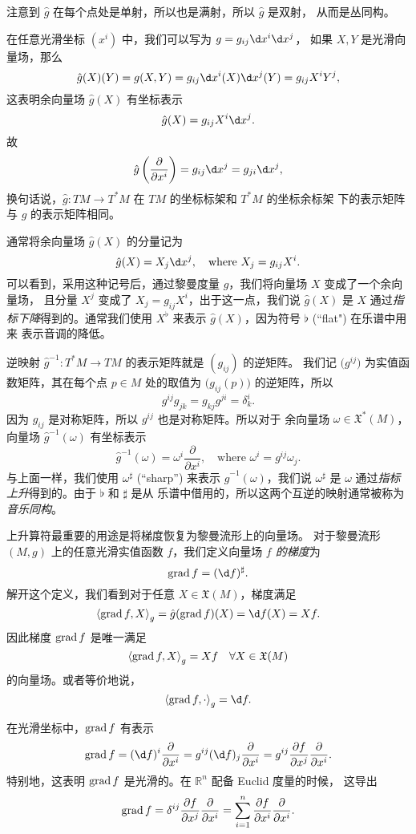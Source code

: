 注意到 $\hat g$ 在每个点处是单射，所以也是满射，所以 $\hat g$ 是双射，
从而是丛同构。

在任意光滑坐标 $(x^i)$ 中，我们可以写为 $g=g_{ij}\d x^i\d x^j$，
如果 $X,Y$ 是光滑向量场，那么
\[
  \hat g(X)(Y)=g(X,Y)=g_{ij}\d x^i(X)\d x^j(Y)=
  g_{ij}X^iY^j,  
\]
这表明余向量场 $\hat g(X)$ 有坐标表示
\[
  \hat g(X)=g_{ij}X^i\d x^j.  
\]
故
\[
  \hat g\left(\frac{\partial}{\partial x^i}\right)=
  g_{ij} \d x^j=g_{ji}\d x^j,  
\]
换句话说，$\hat g:TM\to T^*M$ 在 $TM$ 的坐标标架和 $T^*M$ 的坐标余标架
下的表示矩阵与 $g$ 的表示矩阵相同。

通常将余向量场 $\hat g(X)$ 的分量记为
\[
  \hat g(X)=X_j\d x^j,\quad \text{where $X_j=g_{ij}X^i$}.  
\]
可以看到，采用这种记号后，通过黎曼度量 $g$，我们将向量场 $X$ 变成了一个余向量场，
且分量 $X^j$ 变成了 $X_j=g_{ij}X^i$，出于这一点，我们说
$\hat g(X)$ 是 $X$ 通过\emph{指标下降}得到的。通常我们使用 
$X^\flat$ 来表示 $\hat g(X)$，因为符号 $\flat$ (``flat") 在乐谱中用来
表示音调的降低。

逆映射 $\hat g^{-1}:T^*M\to TM$ 的表示矩阵就是 $(g_{ij})$ 的逆矩阵。
我们记 $\bigl(g^{ij}\bigr)$ 为实值函数矩阵，其在每个点 $p\in M$
处的取值为 $\bigl(g_{ij}(p)\bigr)$ 的逆矩阵，所以
\[
  g^{ij}g_{jk}=g_{kj}g^{ji}=\delta_k^i.  
\]
因为 $g_{ij}$ 是对称矩阵，所以 $g^{ij}$ 也是对称矩阵。所以对于
余向量场 $\omega\in \mathfrak{X}^*(M)$，向量场 $\hat g^{-1}(\omega)$
有坐标表示
\[
  \hat g^{-1}(\omega)=\omega^i\frac{\partial}{\partial x^i},
  \quad \text{where $\omega^i=g^{ij}\omega_j$}  .
\]
与上面一样，我们使用 $\omega^{\sharp}$ (``sharp'') 来表示
$\hat g^{-1}(\omega)$，我们说 $\omega^\sharp$ 是 $\omega$
通过\emph{指标上升}得到的。由于 $\flat$ 和 $\sharp$ 是从
乐谱中借用的，所以这两个互逆的映射通常被称为\emph{音乐同构}。

上升算符最重要的用途是将梯度恢复为黎曼流形上的向量场。
对于黎曼流形 $(M,g)$ 上的任意光滑实值函数 $f$，我们定义向量场
\emph{$f$ 的梯度}为
\[
  \grad f=(\d f)^\sharp.
\]
解开这个定义，我们看到对于任意 $X\in \mathfrak{X}(M)$，梯度满足
\[
  \inn{\grad f,X}_g=\hat g(\grad f)(X)=
  \d f(X)=Xf.
\]
因此梯度 $\operatorname{grad} f$ 是唯一满足
\[
  \left\langle \operatorname{grad} f,X\right\rangle_g=Xf\quad \forall X\in \mathfrak{X}(M)  
\]
的向量场。或者等价地说，
\[
  \inn{\grad f,\cdot}_g=\d f.  
\]

在光滑坐标中，$\operatorname{grad} f$ 有表示
\[
  \grad f=(\d f)^i\frac{\partial}{\partial x^i}
  =g^{ij}(\d f)_j  \frac{\partial}{\partial x^i}
  =g^{ij}\frac{\partial f}{\partial x^j}\frac{\partial}{\partial x^i}.
\]
特别地，这表明 $\operatorname{grad} f$ 是光滑的。在 $\mathbb{R}^n$ 配备 Euclid 度量的时候，
这导出
\[
  \operatorname{grad} f=\delta^{ij}\frac{\partial f}{\partial x^j}\frac{\partial}{\partial x^i}
  =\sum_{i=1}^n\frac{\partial f}{\partial x^i}\frac{\partial}{\partial x^i}.
\]

